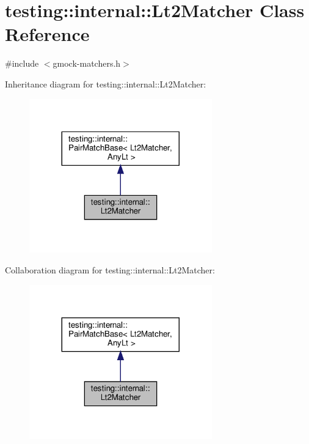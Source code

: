 \hypertarget{classtesting_1_1internal_1_1_lt2_matcher}{}\section{testing\+:\+:internal\+:\+:Lt2\+Matcher Class Reference}
\label{classtesting_1_1internal_1_1_lt2_matcher}


{\ttfamily \#include $<$gmock-\/matchers.\+h$>$}



Inheritance diagram for testing\+:\+:internal\+:\+:Lt2\+Matcher\+:
\nopagebreak
\begin{figure}[H]
\begin{center}
\leavevmode
\includegraphics[width=224pt]{classtesting_1_1internal_1_1_lt2_matcher__inherit__graph}
\end{center}
\end{figure}


Collaboration diagram for testing\+:\+:internal\+:\+:Lt2\+Matcher\+:
\nopagebreak
\begin{figure}[H]
\begin{center}
\leavevmode
\includegraphics[width=224pt]{classtesting_1_1internal_1_1_lt2_matcher__coll__graph}
\end{center}
\end{figure}
